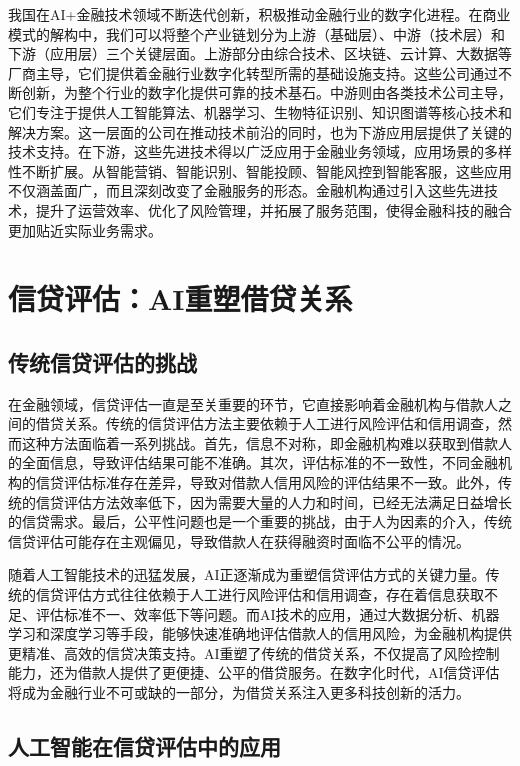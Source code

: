 我国在AI+金融技术领域不断迭代创新，积极推动金融行业的数字化进程。在商业模式的解构中，我们可以将整个产业链划分为上游（基础层）、中游（技术层）和下游（应用层）三个关键层面。上游部分由综合技术、区块链、云计算、大数据等厂商主导，它们提供着金融行业数字化转型所需的基础设施支持。这些公司通过不断创新，为整个行业的数字化提供可靠的技术基石。中游则由各类技术公司主导，它们专注于提供人工智能算法、机器学习、生物特征识别、知识图谱等核心技术和解决方案。这一层面的公司在推动技术前沿的同时，也为下游应用层提供了关键的技术支持。在下游，这些先进技术得以广泛应用于金融业务领域，应用场景的多样性不断扩展。从智能营销、智能识别、智能投顾、智能风控到智能客服，这些应用不仅涵盖面广，而且深刻改变了金融服务的形态。金融机构通过引入这些先进技术，提升了运营效率、优化了风险管理，并拓展了服务范围，使得金融科技的融合更加贴近实际业务需求。

\section{信贷评估：AI重塑借贷关系}
\subsection{传统信贷评估的挑战}

在金融领域，信贷评估一直是至关重要的环节，它直接影响着金融机构与借款人之间的借贷关系。传统的信贷评估方法主要依赖于人工进行风险评估和信用调查，然而这种方法面临着一系列挑战。首先，信息不对称，即金融机构难以获取到借款人的全面信息，导致评估结果可能不准确。其次，评估标准的不一致性，不同金融机构的信贷评估标准存在差异，导致对借款人信用风险的评估结果不一致。此外，传统的信贷评估方法效率低下，因为需要大量的人力和时间，已经无法满足日益增长的信贷需求。最后，公平性问题也是一个重要的挑战，由于人为因素的介入，传统信贷评估可能存在主观偏见，导致借款人在获得融资时面临不公平的情况。

随着人工智能技术的迅猛发展，AI正逐渐成为重塑信贷评估方式的关键力量。传统的信贷评估方式往往依赖于人工进行风险评估和信用调查，存在着信息获取不足、评估标准不一、效率低下等问题。而AI技术的应用，通过大数据分析、机器学习和深度学习等手段，能够快速准确地评估借款人的信用风险，为金融机构提供更精准、高效的信贷决策支持。AI重塑了传统的借贷关系，不仅提高了风险控制能力，还为借款人提供了更便捷、公平的借贷服务。在数字化时代，AI信贷评估将成为金融行业不可或缺的一部分，为借贷关系注入更多科技创新的活力。
\subsection{人工智能在信贷评估中的应用}

